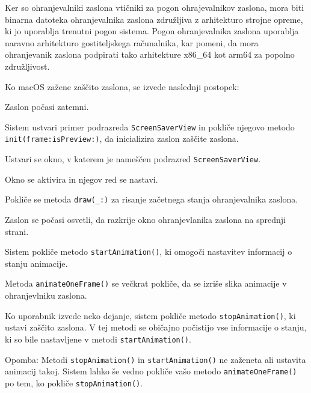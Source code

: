 \documentclass[11pt, oneside]{article}   	%
\begin{document}
Ker so ohranjevalniki zaslona vtičniki za pogon ohrajevalnikov zaslona, mora biti binarna datoteka ohranjevalnika zaslona združljiva z arhitekturo strojne opreme, ki jo uporablja trenutni pogon sistema. Pogon ohranjevalnika zaslona uporablja naravno arhitekturo gostiteljskega računalnika, kar pomeni, da mora ohranjevanik zaslona podpirati tako arhitekture x86\_64 kot arm64 za popolno združljivost.

Ko macOS zažene zaščito zaslona, se izvede naslednji postopek:

\begin{description}[font=$\bullet$~\normalfont]
    \item Zaslon počasi zatemni.
    \item Sistem ustvari primer podrazreda \Verb#ScreenSaverView# in pokliče njegovo metodo \Verb#init(frame:isPreview:)#, da inicializira zaslon zaščite zaslona.
    \item Ustvari se okno, v katerem je nameščen podrazred \Verb#ScreenSaverView#.
    \item Okno se aktivira in njegov red se nastavi.
    \item Pokliče se metoda \Verb#draw(_:)# za risanje začetnega stanja ohranjevalnika zaslona.
    \item Zaslon se počasi osvetli, da razkrije okno ohranjevlanika zaslona na sprednji strani.
    \item Sistem pokliče metodo \Verb#startAnimation()#, ki omogoči nastavitev informacij o stanju animacije.
    \item Metoda \Verb#animateOneFrame()# se večkrat pokliče, da se izriše slika animacije v ohranjevlniku zaslona.
    \item Ko uporabnik izvede neko dejanje, sistem pokliče metodo \Verb#stopAnimation()#, ki ustavi zaščito zaslona. V tej metodi se običajno počistijo vse informacije o stanju, ki so bile nastavljene v metodi \Verb#startAnimation()#.
    \item Opomba: Metodi \Verb#stopAnimation()# in \Verb#startAnimation()# ne zaženeta ali ustavita animacij takoj. Sistem lahko še vedno pokliče vašo metodo \Verb#animateOneFrame()# po tem, ko pokliče \Verb#stopAnimation()#.
\end{description}
\end{document}
